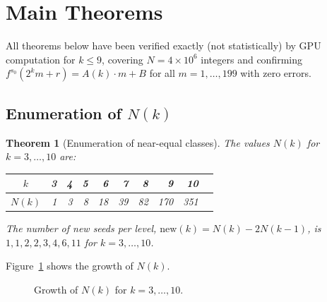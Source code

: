 \documentclass[twocolumn,a4paper,10pt]{article}
\newtheorem{theorem}{Theorem}[section]
\begin{document}
\section{Main Theorems}

All theorems below have been verified exactly (not statistically)
by GPU computation for $k \leq 9$, covering $N = 4 \times 10^6$ integers
and confirming $f^{s_0}(2^k m + r) = A(k)\cdot m + B$ for all $m = 1, \ldots, 199$
with zero errors.

\subsection{Enumeration of $N(k)$}

\begin{theorem}[Enumeration of near-equal classes]\label{thm:Nk}
The values $N(k)$ for $k = 3, \ldots, 10$ are:
\begin{center}
\small
\begin{tabular}{crrrrrrrrr}
\toprule
$k$ & 3 & 4 & 5 & 6 & 7 & 8 & 9 & 10 \\
\midrule
$N(k)$ & 1 & 3 & 8 & 18 & 39 & 82 & 170 & 351 \\
\bottomrule
\end{tabular}
\end{center}
The number of new seeds per level,
$\mathrm{new}(k) = N(k) - 2N(k-1)$,
is $1, 1, 2, 2, 3, 4, 6, 11$ for $k = 3, \ldots, 10$.
\end{theorem}

Figure~\ref{fig:Nk} shows the growth of $N(k)$.

\begin{figure}[h]
\centering
{}
\caption{Growth of $N(k)$ for $k = 3,\ldots,10$.}
\label{fig:Nk}
\end{figure}
\end{document}
